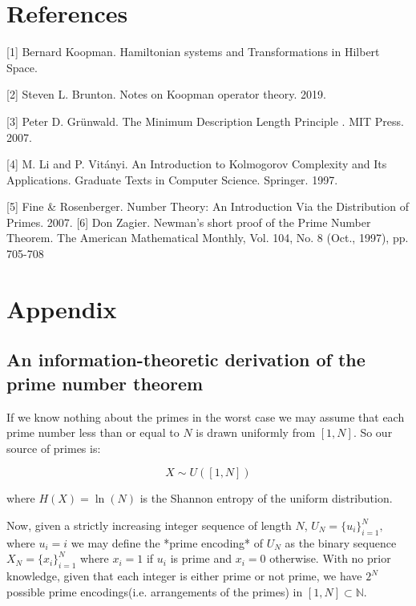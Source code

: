 \documentclass{article}
\begin{document}
\section*{References}

\small

[1] Bernard Koopman. Hamiltonian systems and Transformations in Hilbert Space.

[2] Steven L. Brunton. Notes on Koopman operator theory. 2019.

[3] Peter D. Grünwald. The Minimum Description Length Principle
. MIT Press. 2007.

[4] M. Li and P. Vitányi. An Introduction to Kolmogorov Complexity and Its Applications. Graduate Texts in Computer Science. Springer. 1997.

[5] Fine & Rosenberger. Number Theory: An Introduction Via the Distribution of Primes. 2007.
[6] Don Zagier. Newman’s short proof of the Prime Number Theorem. The American Mathematical Monthly, Vol. 104, No. 8 (Oct., 1997), pp. 705-708

\newpage

\section{Appendix}

\subsection{An information-theoretic derivation of the prime number theorem}

If we know nothing about the primes in the worst case we may assume that each prime number less than or equal to $N$ is drawn uniformly from $[1,N]$. So our source of primes is:

\begin{equation}
X \sim U([1,N]) \tag{1}
\end{equation}

where $H(X) = \ln(N)$ is the Shannon entropy of the uniform distribution.  

Now, given a strictly increasing integer sequence of length $N$, $U_N = \{u_i\}_{i=1}^N,$ where $u_i = i$ we may define the *prime encoding* of $U_N$ as the binary sequence $X_N = \{x_i\}_{i=1}^N$ where $x_i =1$ if $u_i$ is prime and
$x_i=0$ otherwise. With no prior knowledge, given that each integer is either prime or not prime,
we have $2^N$ possible prime encodings(i.e. arrangements of the primes) in $[1,N] \subset \mathbb{N}$.
\end{document}
